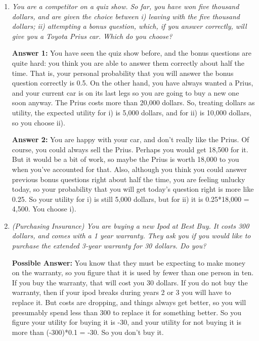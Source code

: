 \documentclass[12pt]{article}
\begin{document}
\bigskip
\begin{enumerate}

\item {\it You are a competitor on a quiz show. So far, you have won five thousand dollars, and are given the choice between i) leaving with the five thousand dollars; ii) attempting a bonus question, which, if you answer correctly, will give you a Toyota Prius car. Which do you choose?}

{\bf Answer 1:} You have seen the quiz show before, and the bonus questions are quite hard: you think
you are able to answer them correctly about half the time. That is, your personal probability that
you will answer the bonus question correctly is 0.5. On the other hand, you have always wanted
a Prius, and your current car is on its last legs so you are going to buy a new one soon
anyway. The Prius costs more than 20,000 dollars. So, treating dollars as utility, the expected utility
for i) is 5,000 dollars, and for ii) is 10,000 dollars, so you choose ii).

{\bf Answer 2:} You are happy with your car, and don't really like the Prius. Of course, you could always
sell the Prius. Perhaps you would get 18,500 for it. But it would be a bit of work, so maybe
the Prius is worth 18,000 to you when you've accounted for that. Also,
although you think you could answer previous bonus questions right about half the time, you
are feeling unlucky today, so your probability that you will get today's question right is more like 0.25.
So your utility for i) is still 5,000 dollars, but for ii) it is 0.25*18,000 = 4,500. You choose i).

\medskip

\item {\it (Purchasing Insurance) You are buying a new Ipod at Best Buy. It costs 300 dollars,
and comes with a 1 year warranty.
They ask you if you would like to purchase the extended 3-year warranty for 30 dollars. Do you?}

{\bf Possible Answer: } You know that they must be expecting to make money on the warranty, so you figure
that it is used by fewer than one person in ten. If you buy the warranty, that will cost you 30 dollars.
If you do not buy the warranty, then if your ipod breaks during years 2 or 3 you will have to replace
it. But costs are dropping, and things always get better, so you will presumably spend less than 300
to replace it for something better. So you figure your utility for buying it is -30, and your
utility for not buying it is more than (-300)*0.1 = -30. So you don't buy it.


\end{enumerate}
\end{document}
